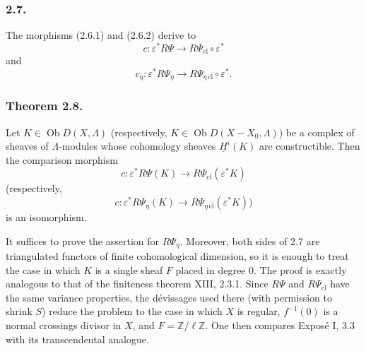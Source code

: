 \subsubsection*{2.7.}
The morphisms (2.6.1) and (2.6.2) derive to
\[
c:\varepsilon^*R\Psi
\longrightarrow R\Psi_{\mathrm{cl}}\circ\varepsilon^*
\]
and
\[
c_\eta:\varepsilon^*R\Psi_\eta
\longrightarrow R\Psi_{\eta\,\mathrm{cl}}\circ\varepsilon^*.
\]

\subsubsection*{Theorem 2.8.}
Let $K\in\operatorname{Ob}D(X,\Lambda)$ (respectively,
$K\in\operatorname{Ob}D(X-X_0,\Lambda)$) be a complex of sheaves of
$\Lambda$-modules whose cohomology sheaves $\underline H^i(K)$ are
constructible.  Then the comparison morphism
\[
c:\varepsilon^*R\Psi(K)
\longrightarrow R\Psi_{\mathrm{cl}}(\varepsilon^*K)
\]
(respectively,
\[
c:\varepsilon^*R\Psi_\eta(K)
\longrightarrow R\Psi_{\eta\,\mathrm{cl}}(\varepsilon^*K))
\]
is an isomorphism.

It suffices to prove the assertion for $R\Psi_\eta$.  Moreover, both
sides of 2.7 are triangulated functors of finite cohomological
dimension, so it is enough to treat the case in which $K$ is a single
sheaf $F$ placed in degree $0$.  The proof is exactly analogous to
that of the finiteness theorem XIII, 2.3.1.  Since $R\Psi$ and
$R\Psi_{\mathrm{cl}}$ have the same variance properties, the
d\'evissages used there (with permission to shrink $S$) reduce the
problem to the case in which $X$ is regular, $f^{-1}(0)$ is a normal
crossings divisor in $X$, and $F=\mathbb Z/\ell\mathbb Z$.  One then
compares Expos\'e I, 3.3 with its transcendental analogue.

